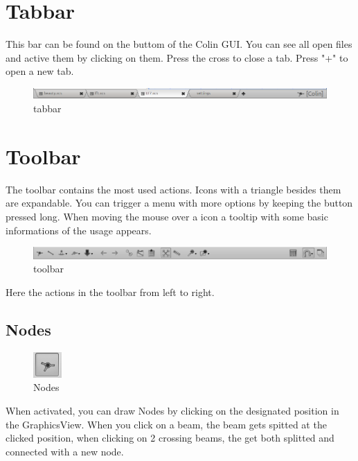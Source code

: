\documentclass[a4paper,11pt]{report}
\begin{document}
\section{Tabbar}
\label{sec:tabbar}
This bar can be found on the buttom of the Colin GUI. You can see all open files and active them by clicking on them. Press the cross to close a tab. Press "+" to open a new tab.
\begin{figure}[H]
\includegraphics[width=\textwidth]{../pictures/tabbar.png}
\caption{tabbar}
\label{pic:tabbar}
\end{figure}

\section{Toolbar}
\label{sec:toolbar}

The toolbar contains the most used actions. Icons with a triangle besides them are expandable. You can trigger a menu with more options by keeping the button pressed long. When moving the mouse over a icon a tooltip with some basic informations of the usage appears. 

\begin{figure}[H]
\includegraphics[width=\textwidth]{../pictures/toolbar.png}
\caption{toolbar}
\label{pic:toolbar}
\end{figure}

Here the actions in the toolbar from left to right.
\subsection{Nodes}
\begin{minipage}[h]{4cm}
\begin{figure}[H]
\begin{center}
\includegraphics[scale=0.6]{../pictures/nodetoolbar.png}
\caption{Nodes}
\label{pic:nodetoolbar}
\end{center}
\end{figure}
\end{minipage}
\begin{minipage}[h]{\textwidth-4cm}
When activated, you can draw Nodes by clicking on the designated position in the GraphicsView. When you click on a beam, the beam gets spitted at the clicked position, when clicking on 2 crossing beams, the get both splitted and connected with a new node.
\end{minipage}
\end{document}
